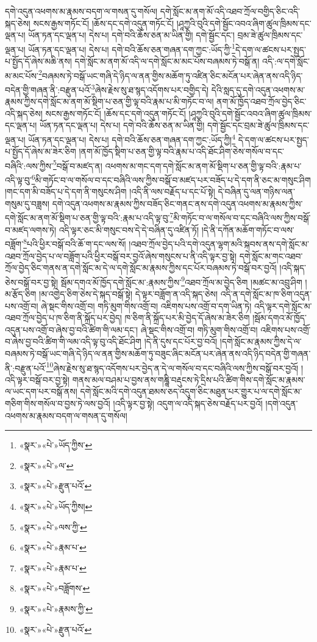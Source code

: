 དགེ་འདུན་འཕགས་མ་རྣམས་བདག་ལ་གསན་དུ་གསོལ། དགེ་སློང་མ་ནག་མོ་འདི་འཐབ་ཀྲོལ་བགྱིད་ཅིང་འདི་སྐད་ཅེས། སངས་རྒྱས་གཏོང་ངོ། །ཆོས་དང་དགེ་འདུན་གཏོང་ངོ། །ཤཱཀྱའི་བུའི་དགེ་སྦྱོང་འབའ་ཞིག་ཚུལ་ཁྲིམས་དང་ལྡན་པ། ཡོན་ཏན་དང་ལྡན་པ། དེས་པ། དགེ་བའི་ཆོས་ཅན་མ་ཡིན་གྱི། དགེ་སྦྱོང་དང་། བྲམ་ཟེ་ཚུལ་ཁྲིམས་དང་ལྡན་པ། ཡོན་ཏན་དང་ལྡན་པ། དེས་པ། དགེ་བའི་ཆོས་ཅན་གཞན་དག་ཀྱང་:ཡོད་ཀྱི་\footnote{«སྣར་»«པེ་»ཡོད་ཀྱིས་}དེ་དག་ལ་ཚངས་པར་སྤྱད་པ་སྤྱོད་དོ་ཞེས་མཆི་ནས། དགེ་སློང་མ་ནག་མོ་འདི་ལ་དགེ་སློང་མ་མང་པོས་བཞམས་ཏེ་བསྒོ་ན། འདི་:ལ་དགེ་སློང་མ་མང་པོས་\footnote{«སྣར་»«པེ་»ལ་}བཞམས་ཏེ་བསྒོ་ཡང་གཞི་དེ་ཉིད་ལ་ནན་གྱིས་མཆོག་ཏུ་འཛིན་ཅིང་མངོན་པར་ཞེན་ནས་འདི་ཉིད་བདེན་གྱི་གཞན་ནི་:བརྫུན་པའོ་\footnote{«སྣར་»«པེ་»རྫུན་པའོ་}ཞེས་རྗེས་སུ་ཐ་སྙད་འདོགས་པར་བགྱིད་དེ། དེའི་སླད་དུ་དགེ་འདུན་འཕགས་མ་རྣམས་ཀྱིས་དགེ་སློང་མ་ནག་མོ་སྡིག་པ་ཅན་གྱི་ལྟ་བའི་རྣམ་པ་མི་གཏོང་བ་ལ། ནག་མོ་ཁྱོད་འཐབ་ཀྲོལ་བྱེད་ཅིང་འདི་སྐད་ཅེས། སངས་རྒྱས་གཏོང་ངོ། །ཆོས་དང་དགེ་འདུན་གཏོང་ངོ། །ཤཱཀྱའི་བུའི་དགེ་སྦྱོང་འབའ་ཞིག་ཚུལ་ཁྲིམས་དང་ལྡན་པ། ཡོན་ཏན་དང་ལྡན་པ། དེས་པ། དགེ་བའི་ཆོས་ཅན་མ་ཡིན་གྱི། དགེ་སྦྱོང་དང་བྲམ་ཟེ་ཚུལ་ཁྲིམས་དང་ལྡན་པ། ཡོན་ཏན་དང་ལྡན་པ། དེས་པ། དགེ་བའི་ཆོས་ཅན་གཞན་དག་ཀྱང་:ཡོད་ཀྱི།\footnote{«སྣར་»«པེ་»ཡོད་ཀྱིས།} དེ་དག་ལ་ཚངས་པར་སྤྱད་པ་སྤྱོད་དོ་ཞེས་མ་ཟེར་ཅིག །ནག་མོ་ཁྱོད་སྡིག་པ་ཅན་གྱི་ལྟ་བའི་རྣམ་པ་འདི་ཐོང་ཤིག་ཅེས་གསོལ་བ་དང་བཞིའི་:ལས་ཀྱིས་\footnote{«སྣར་»«པེ་»ལས་ཀྱི་}བསྒོ་བ་མཛད་ན། འཕགས་མ་གང་དག་དགེ་སློང་མ་ནག་མོ་སྡིག་པ་ཅན་གྱི་ལྟ་བའི་:རྣམ་པ་འདི་ལྟ་བུ་\footnote{«སྣར་»«པེ་»རྣམ་པ་}མི་གཏོང་བ་ལ་གསོལ་བ་དང་བཞིའི་ལས་ཀྱིས་བསྒོ་བ་མཛད་པར་བཟོད་པ་དེ་དག་ནི་ཅང་མ་གསུང་ཤིག །གང་དག་མི་བཟོད་པ་དེ་དག་ནི་གསུངས་ཤིག །འདི་ནི་ལས་བརྗོད་པ་དང་པོ་སྟེ། དེ་བཞིན་དུ་ལན་གཉིས་ལན་གསུམ་དུ་བཟླས། དགེ་འདུན་འཕགས་མ་རྣམས་ཀྱིས་བཟོད་ཅིང་གནང་ནས་དགེ་འདུན་འཕགས་མ་རྣམས་ཀྱིས་དགེ་སློང་མ་ནག་མོ་སྡིག་པ་ཅན་གྱི་ལྟ་བའི་:རྣམ་པ་འདི་ལྟ་བུ་\footnote{«སྣར་»«པེ་»རྣམ་པ་}མི་གཏོང་བ་ལ་གསོལ་བ་དང་བཞིའི་ལས་ཀྱིས་བསྒོ་བ་མཛད་ལགས་ཏེ། འདི་ལྟར་ཅང་མི་གསུང་བས་དེ་དེ་བཞིན་དུ་འཛིན་ཏོ། །དེ་ནི་དཀོན་མཆོག་གཏོང་བ་ལས་བཟློག་\footnote{«སྣར་»«པེ་»བཟློགས་}པའི་ཕྱིར་བསྒོ་བའི་ཆོ་ག་དང་ལས་སོ། །འཐབ་ཀྲོལ་བྱེད་པའི་དགེ་འདུན་ལྷག་མའི་སྐབས་ནས་དགེ་སློང་མ་འཐབ་ཀྲོལ་བྱེད་པ་ལ་བཟློག་པའི་ཕྱིར་བསྒོ་བར་བྱའོ་ཞེས་གསུངས་པ་ནི་འདི་ལྟར་བྱ་སྟེ། དགེ་སློང་མ་གང་འཐབ་ཀྲོལ་བྱེད་ཅིང་གནས་ན་དགེ་སློང་མ་དེ་ལ་དགེ་སློང་མ་རྣམས་ཀྱིས་དང་པོར་བཞམས་ཏེ་བསྒོ་བར་བྱའོ། །འདི་སྐད་ཅེས་བསྒོ་བར་བྱ་སྟེ། སྦོམ་དགའ་མོ་ཁྱོད་དགེ་སློང་མ་:རྣམས་ཀྱིས་\footnote{«སྣར་»«པེ་»རྣམས་ཀྱི་}འཐབ་ཀྲོལ་མ་བྱེད་ཅིག །མཚང་མ་འབྲུ་ཤིག །མ་རྩོད་ཅིག །མ་འགྱེད་ཅིག་ཅེས་དེ་སྐད་བསྒོ་སྟེ། དེ་ལྟར་བཟློག་ན་འདི་སྐད་ཅེས། འདི་ན་དགེ་སློང་མ་ཁ་ཅིག་འདུན་པས་འགྲོ་བ། ཞེ་སྡང་གིས་འགྲོ་བ། གཏི་མུག་གིས་འགྲོ་བ། འཇིགས་པས་འགྲོ་བ་དག་ཡིན་ཏེ། འདི་ལྟར་དགེ་སློང་མ་འཐབ་ཀྲོལ་བྱེད་པ་ཁ་ཅིག་ནི་སྐྲོད་པར་བྱེད། ཁ་ཅིག་ནི་སྐྲོད་པར་མི་བྱེད་དོ་ཞེས་མ་ཟེར་ཅིག །སྦོམ་དགའ་མོ་ཁྱོད་འདུན་པས་འགྲོ་བ་ཞེས་བྱ་བའི་ཚིག་གི་ལམ་དང་། ཞེ་སྡང་གིས་འགྲོ་བ། གཏི་མུག་གིས་འགྲོ་བ། འཇིགས་པས་འགྲོ་བ་ཞེས་བྱ་བའི་ཚིག་གི་ལམ་འདི་ལྟ་བུ་འདི་ཐོང་ཤིག །དེ་ནི་དུས་དང་པོར་བྱ་བའོ། །དགེ་སློང་མ་རྣམས་ཀྱིས་དེ་ལ་བཞམས་ཏེ་བསྒོ་ཡང་གཞི་དེ་ཉིད་ལ་ནན་གྱིས་མཆོག་ཏུ་བཟུང་ཞིང་མངོན་པར་ཞེན་ནས་འདི་ཉིད་བདེན་གྱི་གཞན་ནི་:བརྫུན་པའོ་\footnote{«སྣར་»«པེ་»རྫུན་པའོ་}ཞེས་རྗེས་སུ་ཐ་སྙད་འདོགས་པར་བྱེད་ན་དེ་ལ་གསོལ་བ་དང་བཞིའི་ལས་ཀྱིས་བསྒོ་བར་བྱའོ། །འདི་ལྟར་བསྒོ་བར་བྱ་སྟེ། གནས་མལ་བཤམ་པ་བྱས་ནས་གཎྜཱི་བརྡུངས་ཏེ་དྲིས་པའི་ཚིག་གིས་དགེ་སློང་མ་རྣམས་ལ་ཡང་དག་པར་བསྒོ་ནས། དགེ་སློང་མའི་དགེ་འདུན་ཐམས་ཅད་འདུག་ཅིང་མཐུན་པར་གྱུར་པ་ལ་དགེ་སློང་མ་གཅིག་གིས་གསོལ་བ་བྱས་ཏེ་ལས་བྱའོ། །འདི་ལྟར་བྱ་སྟེ། འདུག་ལ་འདི་སྐད་ཅེས་བརྗོད་པར་བྱའོ། །དགེ་འདུན་འཕགས་མ་རྣམས་བདག་ལ་གསན་དུ་གསོལ། 